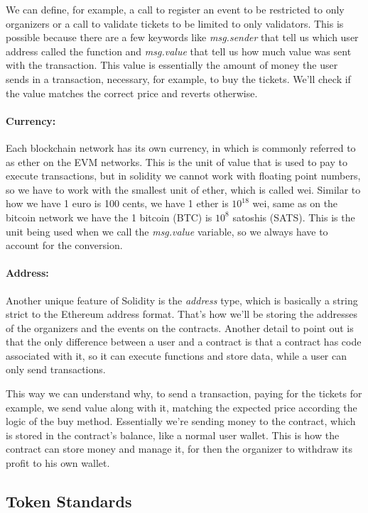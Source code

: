 We can define, for example, a call to register an event to be restricted to
only organizers or a call to validate tickets to be limited to only validators.
This is possible because there are a few keywords like \textit{msg.sender} that
tell us which user address called the function and \textit{msg.value} that tell
us how much value was sent with the transaction. This value is essentially the
amount of money the user sends in a transaction, necessary, for example, to buy
the tickets. We'll check if the value matches the correct price and reverts
otherwise.

\paragraph{Currency:} Each blockchain network has its own currency, in which is commonly referred to
as ether on the EVM networks. This is the unit of value that is used to pay to
execute transactions, but in solidity we cannot work with floating point
numbers, so we have to work with the smallest unit of ether, which is called
wei. Similar to how we have 1 euro is 100 cents, we have 1 ether is $10^{18}$
wei, same as on the bitcoin network we have the 1 bitcoin (BTC) is $10^{8}$
satoshis (SATS). This is the unit being used when we call the
\textit{msg.value} variable, so we always have to account for the conversion.

\paragraph{Address:} Another unique feature of Solidity is the \textit{address} type, which is
basically a string strict to the Ethereum address format. That's how we'll be
storing the addresses of the organizers and the events on the contracts.
Another detail to point out is that the only difference between a user and a
contract is that a contract has code associated with it, so it can execute
functions and store data, while a user can only send transactions.

This way we can understand why, to send a transaction, paying for the tickets
for example, we send value along with it, matching the expected price according
the logic of the buy method. Essentially we're sending money to the contract,
which is stored in the contract's balance, like a normal user wallet. This is
how the contract can store money and manage it, for then the organizer to
withdraw its profit to his own wallet.

\subsection{Token Standards}
\label{subsec:token_standards}

